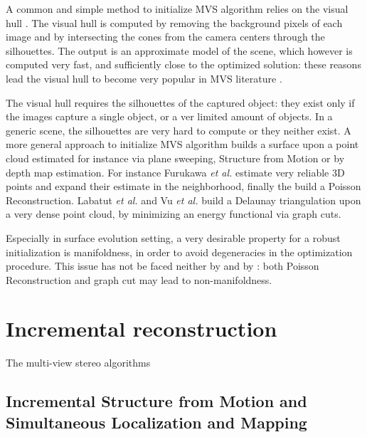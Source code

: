 A common and simple method to initialize MVS algorithm relies on the visual hull \cite{laurentini1994visual}. 
The visual hull is computed by removing the background pixels of each image and by intersecting the cones from the camera centers through the silhouettes. 
The output is an approximate model of the scene, which however is computed very fast, and sufficiently close to the optimized solution: these reasons lead the visual hull to become very popular in MVS literature \cite{jin2002variational,soatto2003tales,zaharescu2007transformesh,yoon2010joint}.

The visual hull requires the silhouettes of the captured object: they exist only if the images capture a single object, or a ver limited amount of objects.
In a generic scene, the silhouettes are very hard to compute or they neither exist.
A more general approach to initialize MVS algorithm builds a surface upon a point cloud estimated for instance via plane sweeping, Structure from Motion or by depth map estimation.
For instance Furukawa \emph{et al.} \cite{fu10} estimate very reliable 3D points and expand their estimate in the neighborhood, finally the build a Poisson Reconstruction. 
Labatut \emph{et al.} \cite{labatut2007efficient} and Vu \emph{et al.} \cite{vu_et_al_2012} build a Delaunay triangulation upon a very dense point cloud, by minimizing an energy functional via graph cuts.

Especially in surface evolution setting, a very desirable property for a robust initialization is manifoldness, in order to avoid degeneracies in the optimization procedure. 
This issue has not be faced neither by \cite{fu10} and by \cite{labatut2007efficient,vu_et_al_2012}: both Poisson Reconstruction and graph cut may lead to non-manifoldness.



\section{Incremental reconstruction} 
The multi-view stereo algorithms 
\subsection{Incremental Structure from Motion and Simultaneous Localization and Mapping}

